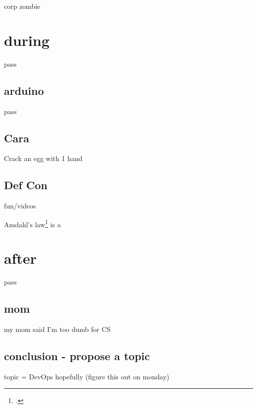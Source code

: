 \documentclass[titlepage]{article}
\begin{document}
corp zombie

\section{during}

pass

\subsection{arduino}

pass

\subsection{Cara}

Crack an egg with 1 hand

\subsection{Def Con}

fun/videos

Amdahl's law\footcite[the cited paper is the law's origin]{Amdahl:1967:VSP:1465482.1465560} is a 


\section{after}

pass


\subsection{mom}

my mom said I'm too dumb for CS

\subsection{conclusion - propose a topic}

topic = DevOps hopefully (figure this out on monday)



\iffalse
\begin{itemize}
    \item readers-writers problem (requires waiting)
    \item producer consumer (1--1) (interrupts) vs consumer consumer (M--M)(roles) (the philosophers are both)
    \item readers-writers problem (requires waiting)
\end{itemize}
\fi
\end{document}

